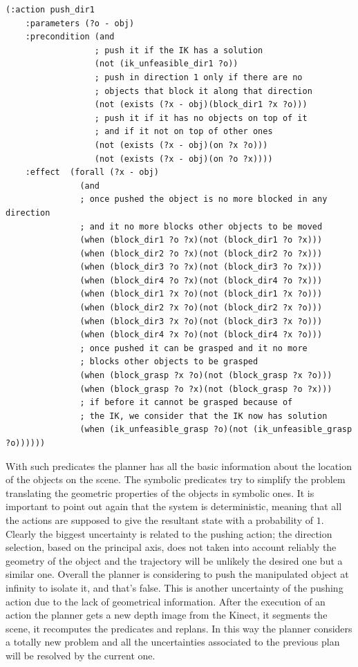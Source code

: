 \lstset{language=pddl}
\begin{lstlisting}[caption={PDDL syntax of the pushing action along direction 1},label=pushPDDL]
(:action push_dir1
    :parameters (?o - obj)
    :precondition (and
                  ; push it if the IK has a solution
                  (not (ik_unfeasible_dir1 ?o)) 
                  ; push in direction 1 only if there are no
                  ; objects that block it along that direction
                  (not (exists (?x - obj)(block_dir1 ?x ?o)))
                  ; push it if it has no objects on top of it
                  ; and if it not on top of other ones
                  (not (exists (?x - obj)(on ?x ?o)))
                  (not (exists (?x - obj)(on ?o ?x))))
    :effect  (forall (?x - obj)
               (and
               ; once pushed the object is no more blocked in any direction
               ; and it no more blocks other objects to be moved
               (when (block_dir1 ?o ?x)(not (block_dir1 ?o ?x)))
               (when (block_dir2 ?o ?x)(not (block_dir2 ?o ?x)))
               (when (block_dir3 ?o ?x)(not (block_dir3 ?o ?x)))
               (when (block_dir4 ?o ?x)(not (block_dir4 ?o ?x)))
               (when (block_dir1 ?x ?o)(not (block_dir1 ?x ?o)))
               (when (block_dir2 ?x ?o)(not (block_dir2 ?x ?o)))
               (when (block_dir3 ?x ?o)(not (block_dir3 ?x ?o)))
               (when (block_dir4 ?x ?o)(not (block_dir4 ?x ?o)))
               ; once pushed it can be grasped and it no more
               ; blocks other objects to be grasped
               (when (block_grasp ?x ?o)(not (block_grasp ?x ?o)))
               (when (block_grasp ?o ?x)(not (block_grasp ?o ?x)))
               ; if before it cannot be grasped because of 
               ; the IK, we consider that the IK now has solution
               (when (ik_unfeasible_grasp ?o)(not (ik_unfeasible_grasp ?o))))))
\end{lstlisting}

\mbox{}


With such predicates the planner has all the basic information about the location of the objects on the scene. The symbolic predicates try to simplify the problem translating the geometric properties of the objects in symbolic ones. It is important to point out again that the system is deterministic, meaning that all the actions are supposed to give the resultant state with a probability of $1$. Clearly the biggest uncertainty is related to the pushing action; the direction selection, based on the principal axis, does not taken into account reliably the geometry of the object and the trajectory will be unlikely the desired one but a similar one. Overall the planner is considering to push the manipulated object at infinity to isolate it, and that's false. This is another uncertainty of the pushing action due to the lack of geometrical information. 
After the execution of an action the planner gets a new depth image from the Kinect, it segments the scene, it recomputes the predicates and replans. In this way the planner considers a totally new problem and all the uncertainties associated to the previous plan will be resolved by the current one. 

